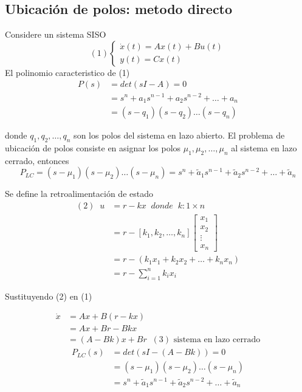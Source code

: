\subsection{Ubicación de polos: metodo directo}
Considere un sistema SISO
\[
    (1)
    \left\{
        \begin{array}{lll}
            \dot{x}(t) = Ax(t) + Bu(t)\\
            y(t) = Cx(t)
        \end{array}
    \right.
\]
El polinomio caracteristico de (1)
\[
    \begin{split}
        P(s) & = det(sI-A) = 0\\
        & = s^{n} + a_{1}s^{n-1} + a_{2}s^{n-2} + \ldots + a_{n}\\
        & = (s-q_{1}) (s-q_{2}) \ldots (s-q_{n})
    \end{split}
\]

donde \(q_{1}, q_{2}, \ldots, q_{n}\) son los polos del sistema en lazo abierto.
El problema de ubicación de polos consiste en asignar los polos \( \mu_{1}, \mu_{2}, \ldots, \mu_{n} \) al sistema en lazo cerrado, entonces
\[
    P_{LC} = (s-\mu_{1}) (s-\mu_{2}) \ldots (s-\mu_{n}) = s^{n} + \tilde{a}_{1}s^{n-1} + \tilde{a}_{2}s^{n-2} + \ldots + \tilde{a}_{n}
\]

Se define la retroalimentación de estado
\[
    \begin{split}
        (2)\;\; 
        u & = r - kx \;\;donde\;\; k:1\times n\\
        & = r - [k_{1}, k_{2}, \ldots, k_{n}]
        \begin{bmatrix}
            x_{1}\\
            x_{2}\\
            \vdots\\
            x_{n}
        \end{bmatrix}\\
        & = r - (k_{1}x_{1} + k_{2}x_{2} + \ldots + k_{n}x_{n})\\
        & = r - \sum_{i=1}^{n} k_{i}x_{i}
    \end{split}
\]

Sustituyendo (2) en (1)

\[
    \begin{split}
        \dot{x} & = Ax + B(r-kx) \\
        & = Ax + Br -Bkx\\
        & = (A-Bk)x + Br \;\; (3) \text{ sistema en lazo cerrado}
    \end{split}
\]
\[
    \begin{split}
        P_{LC}(s) & = det(sI-(A -Bk)) = 0\\
        & = (s-\mu_{1}) (s-\mu_{2}) \ldots (s-\mu_{n})\\
        & = s^{n} + \tilde{a}_{1}s^{n-1} + \tilde{a}_{2}s^{n-2} + \ldots + \tilde{a}_{n}
    \end{split}
\]
